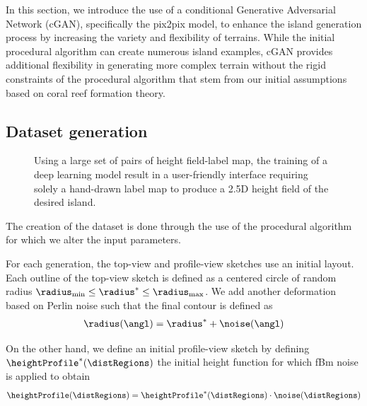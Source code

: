 In this section, we introduce the use of a conditional Generative Adversarial Network (cGAN), specifically the pix2pix model, to enhance the island generation process by increasing the variety and flexibility of terrains. While the initial procedural algorithm can create numerous island examples, cGAN provides additional flexibility in generating more complex terrain without the rigid constraints of the procedural algorithm that stem from our initial assumptions based on coral reef formation theory.








\subsection{Dataset generation}
\label{sec:coral-island_dataset-generation}


\begin{figure}[H]
	\centering
    \caption{Using a large set of pairs of height field-label map, the training of a deep learning model result in a user-friendly interface requiring solely a hand-drawn label map to produce a 2.5D height field of the desired island.}
    \label{fig:coral-island_cGAN-pipeline}
\end{figure}


The creation of the dataset is done through the use of the procedural algorithm for which we alter the input parameters. 

For each generation, the top-view and profile-view sketches use an initial layout. Each outline of the top-view sketch is defined as a centered circle of random radius $\radius_\text{min} \leq \radius^* \leq \radius_\text{max}$. We add another deformation based on Perlin noise such that the final contour is defined as 
\begin{align}
    \radius(\angl) = \radius^* + \noise(\angl)
\end{align}

On the other hand, we define an initial profile-view sketch by defining $\heightProfile^*(\distRegions)$ the initial height function for which fBm noise is applied to obtain 
\begin{align}
    \heightProfile(\distRegions) = \heightProfile^*(\distRegions) \cdot \noise(\distRegions)
\end{align}

